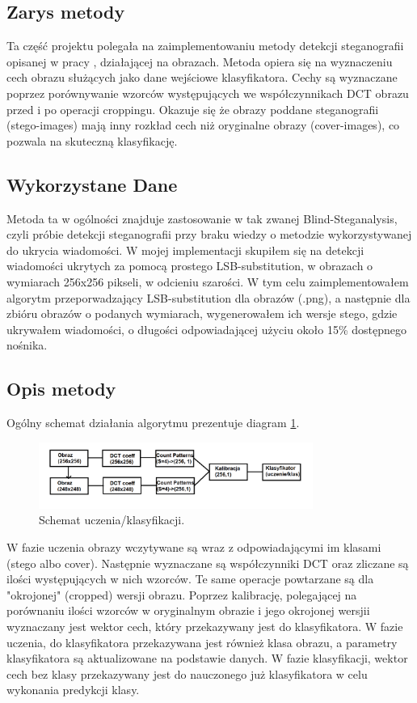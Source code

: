\subsection{Zarys metody}
Ta część projektu polegała na zaimplementowaniu metody detekcji steganografii opisanej w pracy \cite{dct_match_article}, działającej na obrazach. Metoda opiera się na wyznaczeniu cech obrazu służących jako dane wejściowe klasyfikatora. Cechy są wyznaczane poprzez porównywanie wzorców występujących we współczynnikach DCT obrazu przed i po operacji croppingu. Okazuje się że obrazy poddane steganografii (stego-images) mają inny rozkład cech niż oryginalne obrazy (cover-images), co pozwala na skuteczną klasyfikację.\\

\subsection{Wykorzystane Dane}
Metoda ta w ogólności znajduje zastosowanie w tak zwanej Blind-Steganalysis, czyli próbie detekcji steganografii przy braku wiedzy o metodzie wykorzystywanej do ukrycia wiadomości. W mojej implementacji skupiłem się na detekcji wiadomości ukrytych za pomocą prostego LSB-substitution, w obrazach o wymiarach 256x256 pikseli, w odcieniu szarości. W tym celu zaimplementowałem algorytm przeporwadzający LSB-substitution dla obrazów (.png), a następnie dla zbióru obrazów o podanych wymiarach, wygenerowałem ich wersje stego, gdzie ukrywałem wiadomości, o długości odpowiadającej użyciu około 15\% dostępnego nośnika.\\ 

\subsection{Opis metody}
Ogólny schemat działania algorytmu prezentuje diagram \ref{fig:dct_match_scheme}.
\begin{figure}[ht!]
	\centering
	\includegraphics[width=0.8\textwidth]{./img/dct_match_scheme.png}
	\caption{\label{fig:dct_match_scheme} Schemat uczenia/klasyfikacji.}
\end{figure}

W fazie uczenia obrazy wczytywane są wraz z odpowiadającymi im klasami (stego albo cover). Następnie wyznaczane są współczynniki DCT oraz zliczane są ilości występujących w nich wzorców. Te same operacje powtarzane są dla "okrojonej" (cropped) wersji obrazu. Poprzez kalibrację, polegającej na porównaniu ilości wzorców w oryginalnym obrazie i jego okrojonej wersjii wyznaczany jest wektor cech, który przekazywany jest do klasyfikatora. W fazie uczenia, do klasyfikatora przekazywana jest również klasa obrazu, a parametry klasyfikatora są aktualizowane na podstawie danych. W fazie klasyfikacji, wektor cech bez klasy przekazywany jest do nauczonego już klasyfikatora w celu wykonania predykcji klasy.\\

